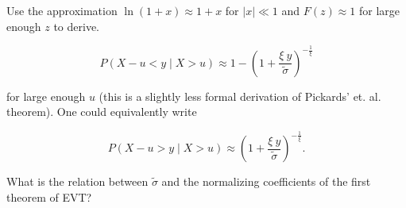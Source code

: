 Use the approximation $\ln(1+x) \approx 1 + x$ for $|x| \ll 1$ and $F(z) \approx
1$ for large enough $z$ to derive.


\begin{equation}
    \label{GPD-approx-original}
    P(X-u < y \mid X > u) \approx 1 - \left( 1 + \frac{\xi \ y}{\tilde{\sigma}} \right)^{-\frac{1}{\xi}} 
\end{equation}


for large enough $u$ (this is a slightly less formal derivation of Pickards' et.
al. theorem). One could equivalently write


\begin{equation}
    P(X-u > y \mid X > u) \approx \left( 1 + \frac{\xi \ y}{\tilde{\sigma}} \right)^{-\frac{1}{\xi}}.
\end{equation}


What is the relation between $\tilde{\sigma}$ and the normalizing coefficients
of the first theorem of EVT?

